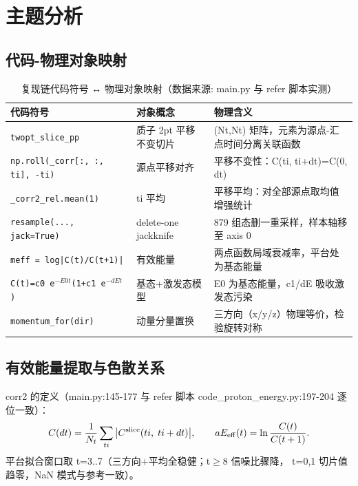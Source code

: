 \documentclass[UTF8]{ctexart}
\begin{document}
\section{主题分析}
\subsection{代码-物理对象映射}
\begin{table}[htbp]\centering
\begin{tabularx}{\textwidth}{lX X}
\toprule
\textcolor{struct}{代码符号} & \textcolor{struct}{对象概念} & \textcolor{struct}{物理含义} \\
\midrule
\texttt{twopt\_slice\_pp} & 质子 2pt 平移不变切片 & (Nt,Nt) 矩阵，元素为源点-汇点时间分离关联函数 \\
\texttt{np.roll(\_corr[:, :, ti], -ti)} & 源点平移对齐 & 平移不变性：C(ti, ti+dt)=C(0, dt) \\
\texttt{\_corr2\_rel.mean(1)} & ti 平均 & 平移平均：对全部源点取均值增强统计 \\
\texttt{resample(..., jack=True)} & delete-one jackknife & 879 组态删一重采样，样本轴移至 axis 0 \\
\texttt{meff = log|C(t)/C(t+1)|} & 有效能量 & 两点函数局域衰减率，平台处为基态能量 \\
\texttt{C(t)=c0 e$^{-E0 t}$(1+c1 e$^{-dE t}$)} & 基态+激发态模型 & E0 为基态能量，c1/dE 吸收激发态污染 \\
\texttt{momentum\_for(dir)} & 动量分量置换 & 三方向（x/y/z）物理等价，检验旋转对称 \\
\bottomrule
\end{tabularx}
\caption{复现链代码符号 ↔ 物理对象映射（数据来源: main.py 与 refer 脚本实测）}
\end{table}

\subsection{有效能量提取与色散关系}
corr2 的定义（main.py:145-177 与 refer 脚本 code\_proton\_energy.py:197-204 逐位一致）：
\begin{equation}\label{eq:corr2}
C(dt)=\frac{1}{N_t}\sum_{ti}\big|C^{\rm slice}(ti,\;ti+dt)\big|,\qquad
aE_{\rm eff}(t)=\ln\frac{C(t)}{C(t+1)} .
\end{equation}
平台拟合窗口取 t=3..7（三方向+平均全稳健；t$\ge$8 信噪比骤降，
t=0,1 切片值趋零，NaN 模式与参考一致）。
\end{document}
